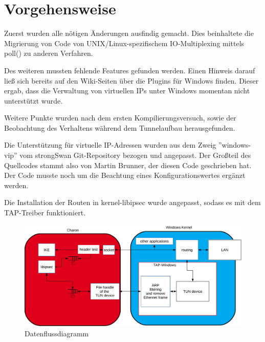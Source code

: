 



\section{Vorgehensweise}

Zuerst wurden alle nötigen Änderungen ausfindig gemacht. Dies beinhaltete
die Migrierung von Code von UNIX/Linux-spezifischem IO-Multiplexing
mittels poll() zu anderen Verfahren.

Des weiteren mussten fehlende Features gefunden werden. Einen Hinweis
darauf ließ sich bereits auf den Wiki-Seiten über die Plugins für Windows finden.
Dieser ergab, dass die Verwaltung von virtuellen IPs unter Windows momentan
nicht unterstützt wurde.

Weitere Punkte wurden nach dem ersten Kompilierungsversuch, sowie der Beobachtung
des Verhaltens während dem Tunnelaufbau herausgefunden.

Die Unterstützung für virtuelle IP-Adressen wurden aus dem Zweig ''windows-vip''
vom strongSwan Git-Repository bezogen und angepasst. Der Großteil des Quellcodes
stammt also von Martin Brunner, der diesen Code geschrieben hat. Der Code musste
noch um die Beachtung eines Konfigurationswertes ergänzt werden.

Die Installation der Routen in kernel-libipsec wurde angepasst, sodass es
mit dem TAP-Treiber funktioniert.

\begin{figure}[!ht]
\includegraphics[width=\textwidth]{Diagram.eps}
\caption{Datenflussdiagramm}
\label{fig:Datenflussdiagramm}
\end{figure}

